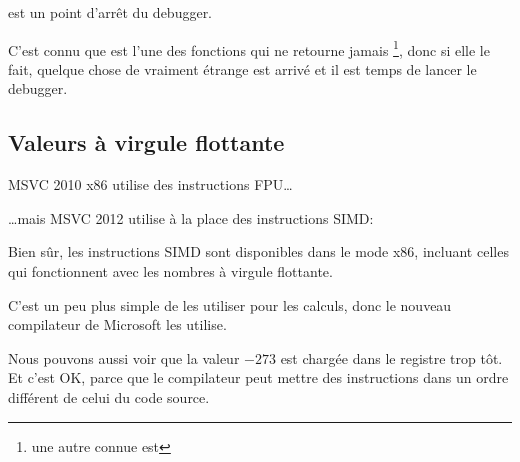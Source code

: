  est un point d'arrêt du debugger.

C'est connu que  est l'une des fonctions qui ne retourne jamais
\footnote{une autre connue est },
donc si elle le fait, quelque chose de vraiment étrange est arrivé et il est temps de lancer le debugger.

\subsection{Valeurs à virgule flottante}



MSVC 2010 x86 utilise des instructions \ac{FPU}\dots



\dots mais MSVC 2012 utilise à la place des instructions \ac{SIMD}:



Bien sûr, les instructions \ac{SIMD} sont disponibles dans le mode x86,
incluant celles qui fonctionnent avec les nombres à virgule flottante.

C'est un peu plus simple de les utiliser pour les calculs, donc le nouveau compilateur de Microsoft les utilise.

Nous pouvons aussi voir que la valeur $-273$
est chargée dans le registre  trop tôt.
Et c'est OK, parce que le compilateur peut mettre des instructions dans un ordre
différent de celui du code source.

